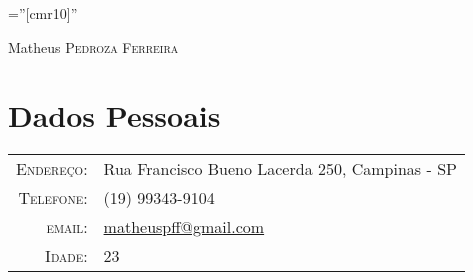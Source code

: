 \pagestyle{empty} %

\font\fb=''[cmr10]'' %

\par{\centering
		{\Huge Matheus \textsc{Pedroza Ferreira}
	}\bigskip\par}

\section{Dados Pessoais}

\begin{tabular}{rl}
    \textsc{Endereço:}   & Rua Francisco Bueno Lacerda 250, Campinas - SP \\
    \textsc{Telefone:}   & (19) 99343-9104 \\
    \textsc{email:}      & \href{mailto:matheuspff@gmail.com}{matheuspff@gmail.com}  \\
    \textsc{Idade:}      & 23 \\
\end{tabular}\\
